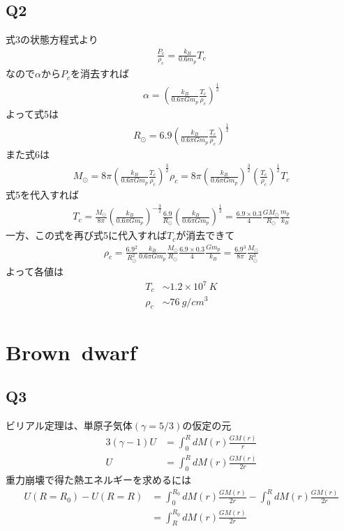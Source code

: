 \subsection{Q2}
式3の状態方程式より
\begin{align*}
    \frac{P_c}{\rho_c}=\frac{k_B}{0.6m_p}T_c
\end{align*}
なので$\alpha$から$P_c$を消去すれば
\begin{align*}
    \alpha=\left(\frac{k_B}{0.6\pi Gm_p}\frac{T_c}{\rho_c}\right)^{\frac{1}{2}}
\end{align*}
よって式5は
\begin{align*}
    R_{\odot}=6.9\left(\frac{k_B}{0.6\pi Gm_p}\frac{T_c}{\rho_c}\right)^{\frac{1}{2}}
\end{align*}
また式6は
\begin{align*}
    M_{\odot}=8\pi\left(\frac{k_B}{0.6\pi Gm_p}\frac{T_c}{\rho_c}\right)^{\frac{3}{2}}\rho_c=8\pi\left(\frac{k_B}{0.6\pi Gm_p}\right)^{\frac{3}{2}}\left(\frac{T_c}{\rho_c}\right)^{\frac{1}{2}}T_c
\end{align*}
式5を代入すれば
\begin{align*}
    T_c=\frac{M_{\odot}}{8\pi}\left(\frac{k_B}{0.6\pi Gm_p}\right)^{-\frac{3}{2}}\frac{6.9}{R_{\odot}}\left(\frac{k_B}{0.6\pi Gm_p}\right)^{\frac{1}{2}}=\frac{6.9\times0.3}{4}\frac{GM_{\odot}}{R_{\odot}}\frac{m_p}{k_B}
\end{align*}
一方、この式を再び式5に代入すれば$T_c$が消去できて
\begin{align*}
    \rho_c=\frac{6.9^2}{R^2_{\odot}}\frac{k_B}{0.6\pi Gm_p}\frac{M_{\odot}}{R_{\odot}}\frac{6.9\times0.3}{4}\frac{Gm_p}{k_B}=\frac{6.9^3}{8\pi}\frac{M_{\odot}}{R^3_{\odot}}
\end{align*}
よって各値は
\begin{align}
    T_c&\sim1.2\times10^7\ K\\
    \rho_c&\sim76\ g/cm^3
\end{align}
\section{Brown\ dwarf}
\subsection{Q3}
ビリアル定理は、単原子気体$(\gamma=5/3)$の仮定の元
\begin{align*}
    3(\gamma-1)U&=\int^R_0dM(r)\frac{GM(r)}{r}\\
    U&=\int^R_0dM(r)\frac{GM(r)}{2r}
\end{align*}
重力崩壊で得た熱エネルギーを求めるには
\begin{align}
    U(R=R_0)-U(R=R)&=\int^{R_0}_0dM(r)\frac{GM(r)}{2r}-\int^R_0dM(r)\frac{GM(r)}{2r}\nonumber\\
    &=\int^{R_0}_RdM(r)\frac{GM(r)}{2r}
\end{align}
